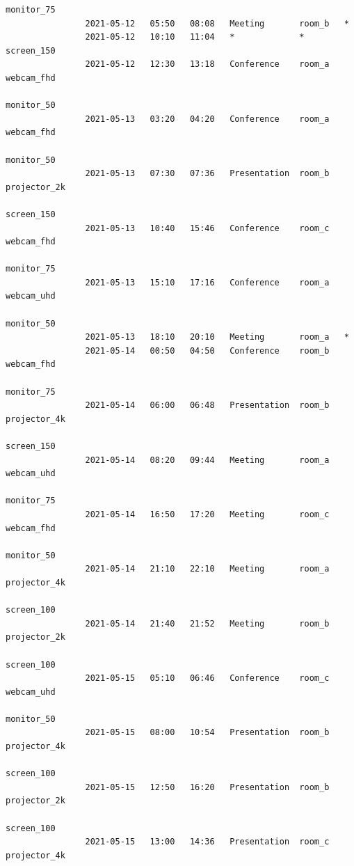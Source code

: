\documentclass{article}
\begin{document}
\begin{Verbatim}[gobble=8]
                                                                    monitor_75
                2021-05-12   05:50   08:08   Meeting       room_b   *
                2021-05-12   10:10   11:04   *             *        screen_150
                2021-05-12   12:30   13:18   Conference    room_a   webcam_fhd
                                                                    monitor_50
                2021-05-13   03:20   04:20   Conference    room_a   webcam_fhd
                                                                    monitor_50
                2021-05-13   07:30   07:36   Presentation  room_b   projector_2k
                                                                    screen_150
                2021-05-13   10:40   15:46   Conference    room_c   webcam_fhd
                                                                    monitor_75
                2021-05-13   15:10   17:16   Conference    room_a   webcam_uhd
                                                                    monitor_50
                2021-05-13   18:10   20:10   Meeting       room_a   *
                2021-05-14   00:50   04:50   Conference    room_b   webcam_fhd
                                                                    monitor_75
                2021-05-14   06:00   06:48   Presentation  room_b   projector_4k
                                                                    screen_150
                2021-05-14   08:20   09:44   Meeting       room_a   webcam_uhd
                                                                    monitor_75
                2021-05-14   16:50   17:20   Meeting       room_c   webcam_fhd
                                                                    monitor_50
                2021-05-14   21:10   22:10   Meeting       room_a   projector_4k
                                                                    screen_100
                2021-05-14   21:40   21:52   Meeting       room_b   projector_2k
                                                                    screen_100
                2021-05-15   05:10   06:46   Conference    room_c   webcam_uhd
                                                                    monitor_50
                2021-05-15   08:00   10:54   Presentation  room_b   projector_4k
                                                                    screen_100
                2021-05-15   12:50   16:20   Presentation  room_b   projector_2k
                                                                    screen_100
                2021-05-15   13:00   14:36   Presentation  room_c   projector_4k

\end{Verbatim}
\end{document}
